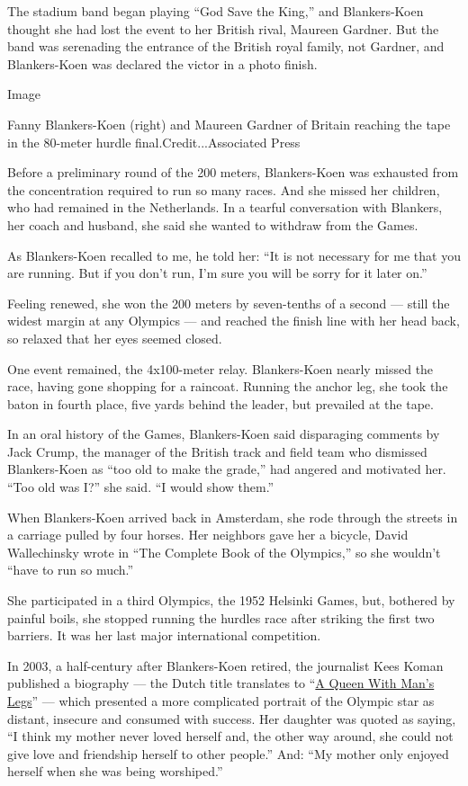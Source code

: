 The stadium band began playing ``God Save the King,'' and Blankers-Koen
thought she had lost the event to her British rival, Maureen Gardner.
But the band was serenading the entrance of the British royal family,
not Gardner, and Blankers-Koen was declared the victor in a photo
finish.

Image

Fanny Blankers-Koen (right) and Maureen Gardner of Britain reaching the
tape in the 80-meter hurdle final.Credit...Associated Press

Before a preliminary round of the 200 meters, Blankers-Koen was
exhausted from the concentration required to run so many races. And she
missed her children, who had remained in the Netherlands. In a tearful
conversation with Blankers, her coach and husband, she said she wanted
to withdraw from the Games.

As Blankers-Koen recalled to me, he told her: ``It is not necessary for
me that you are running. But if you don't run, I'm sure you will be
sorry for it later on.''

Feeling renewed, she won the 200 meters by seven-tenths of a second ---
still the widest margin at any Olympics --- and reached the finish line
with her head back, so relaxed that her eyes seemed closed.

One event remained, the 4x100-meter relay. Blankers-Koen nearly missed
the race, having gone shopping for a raincoat. Running the anchor leg,
she took the baton in fourth place, five yards behind the leader, but
prevailed at the tape.

In an oral history of the Games, Blankers-Koen said disparaging comments
by Jack Crump, the manager of the British track and field team who
dismissed Blankers-Koen as ``too old to make the grade,'' had angered
and motivated her. ``Too old was I?'' she said. ``I would show them.''

When Blankers-Koen arrived back in Amsterdam, she rode through the
streets in a carriage pulled by four horses. Her neighbors gave her a
bicycle, David Wallechinsky wrote in ``The Complete Book of the
Olympics,'' so she wouldn't ``have to run so much.''

She participated in a third Olympics, the 1952 Helsinki Games, but,
bothered by painful boils, she stopped running the hurdles race after
striking the first two barriers. It was her last major international
competition.

In 2003, a half-century after Blankers-Koen retired, the journalist Kees
Koman published a biography --- the Dutch title translates to
``\href{https://www.independent.co.uk/sport/olympics/blankers-jnr-my-mother-only-enjoyed-herself-when-she-was-being-worshipped-2319488.html}{A
Queen With Man's Legs}'' --- which presented a more complicated portrait
of the Olympic star as distant, insecure and consumed with success. Her
daughter was quoted as saying, ``I think my mother never loved herself
and, the other way around, she could not give love and friendship
herself to other people.'' And: ``My mother only enjoyed herself when
she was being worshiped.''

